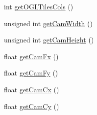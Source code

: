 \begin{DoxyCompactItemize}
int \hyperlink{classVisualProprioception_a1f292b50c80393a45c557f83c82f26fd}{get\+O\+G\+L\+Tiles\+Cols} ()
\item 
unsigned int \hyperlink{classVisualProprioception_ac0507d6a1074bce7d5b6219a296977a5}{get\+Cam\+Width} ()
\item 
unsigned int \hyperlink{classVisualProprioception_a79a29f5b902dc1010c6e4def39e3e50d}{get\+Cam\+Height} ()
\item 
float \hyperlink{classVisualProprioception_a91eb7689001066cc251ebc4aa45e361e}{get\+Cam\+Fx} ()
\item 
float \hyperlink{classVisualProprioception_ad10ced05538f8f5f86b4c320e857bb19}{get\+Cam\+Fy} ()
\item 
float \hyperlink{classVisualProprioception_aca4a0fe7a02cdab6fa8587fd0341d824}{get\+Cam\+Cx} ()
\item 
float \hyperlink{classVisualProprioception_a1fb91fd83b8bf70134f36b3c8f3023b5}{get\+Cam\+Cy} ()
\end{DoxyCompactItemize}

